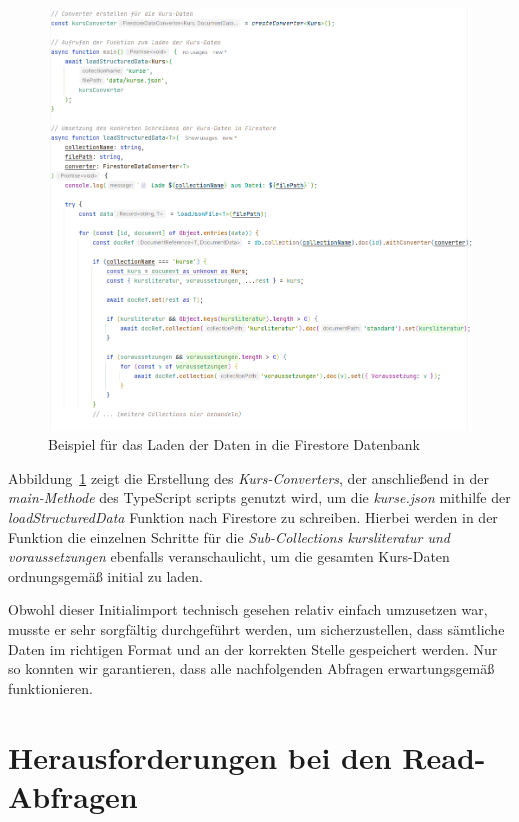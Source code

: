 \documentclass[12pt,a4paper%
              ,oneside     %
              ,titlepage
              ,DIV=13
              ,headinclude
              ,footinclude=false%
              ,cleardoublepage=empty%
              ,parskip=half,
              BCOR=0mm,
              ]{scrreprt}
\begin{document}
\begin{figure}[H]
	\centering
	\includegraphics[width=\dimexpr0.9\linewidth]{img/schreiben_beispiel.png}
	\caption{Beispiel für das Laden der Daten in die Firestore Datenbank}
	\label{fig:load_example}
\end{figure}

Abbildung~\ref{fig:load_example} zeigt die Erstellung des \textit{Kurs-Converters}, der anschließend in der \textit{main-Methode} des TypeScript scripts genutzt wird, um die \textit{kurse.json} mithilfe der \textit{loadStructuredData} Funktion nach Firestore zu schreiben. Hierbei werden in der Funktion die einzelnen Schritte für die \textit{Sub-Collections kursliteratur und voraussetzungen} ebenfalls veranschaulicht, um die gesamten Kurs-Daten ordnungsgemäß initial zu laden.

Obwohl dieser Initialimport technisch gesehen relativ einfach umzusetzen war, musste er sehr sorgfältig durchgeführt werden, um sicherzustellen, dass sämtliche Daten im richtigen Format und an der korrekten Stelle gespeichert werden. Nur so konnten wir garantieren, dass alle nachfolgenden Abfragen erwartungsgemäß funktionieren.

\chapter{Herausforderungen bei den Read-Abfragen}
\end{document}
